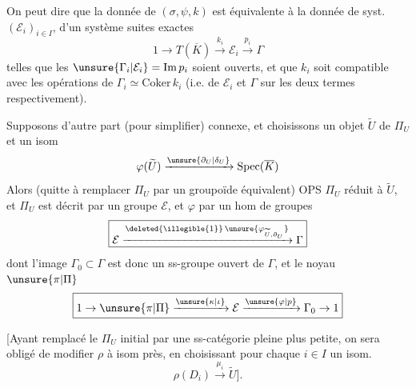 
On peut dire que la donnée de $(\sigma,\psi,k)$ est équivalente
à la donnée de syst. $(\mathcal E_i)_{i\in I}$, d'un système
  suites exactes
\[
\boxed{1\to T(\overline K)\xrightarrow{k_i}\mathcal E_i
\xrightarrow{p_i}\Gamma}
\]
telles que les $\unsure{\Gamma_i|\mathcal E_i}
=\mathrm{Im}\,p_i$ soient ouverts, et que $k_i$ soit compatible
avec les opérations de $\Gamma_i\simeq\mathrm{Coker}\,k_i$
(i.e. de $\mathcal E_i$ et $\Gamma$ sur les deux termes respectivement).


Supposons d'autre part (pour simplifier)
 connexe,
et choisissons un objet $\widetilde U$ de $\Pi_U$ et un isom
\[
\varphi(\widetilde U)\xrightarrow{\unsure{\partial_U|\delta_U}}
\mathrm{Spec}(\overline K)
\]
Alors (quitte à remplacer $\Pi_U$ par un groupoïde équivalent)
OPS $\Pi_U$ réduit à $\widetilde U$, et $\Pi_U$ est décrit par
un groupe $\mathcal E$, et $\varphi$ par un hom de groupes
\[
\boxed{\mathcal E
\xrightarrow{\deleted{\illegible{1}}\,\unsure{\varphi_{\widetilde U,\partial_U}}}
\Gamma}
\]
dont l'image $\Gamma_0\subset\Gamma$ est donc un ss-groupe ouvert
de $\Gamma$, et le noyau  $\unsure{\pi|\Pi}$
\[
\boxed{1\to\unsure{\pi|\Pi}\xrightarrow{\unsure{\kappa|\iota}}\mathcal E
\xrightarrow{\unsure{\varphi|p}}\Gamma_0\to1}
\]


[Ayant remplacé le $\Pi_U$ initial par une ss-catégorie pleine
plus petite, on sera obligé de modifier $\rho$ à isom près,
 en choisissant pour chaque $i\in I$ un isom.
\[
\rho(D_i)\xrightarrow{\mu_i}\widetilde U].
\]


